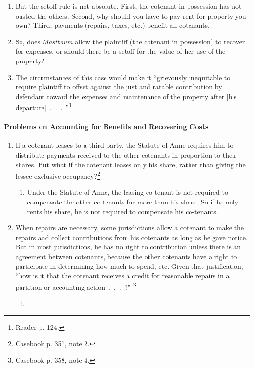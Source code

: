 \begin{enumerate}
\begin{enumerate}
        maintaining the property, ``many courts deemed it equitable that the 
        occupying tenant give credit for the value of his use and 
        occupation.''\footnote{Reader p. 123.}
        \item But the setoff rule is not absolute. First, the cotenant in 
        possession has not ousted the others. Second, why should you have to 
        pay rent for property you own? Third, payments (repairs, taxes, etc.) 
        benefit all cotenants.
        \item So, does \emph{Mastbaum} allow the plaintiff (the cotenant in 
        possession) to recover for expenses, or should there be a setoff for 
        the value of her use of the property?
        \item The circumstances of this case would make it ``grievously 
        inequitable to require plaintiff to offset against the just and 
        ratable contribution by defendant toward the expenses and maintenance 
        of the property after [his departure]~.~.~.~''\footnote{Reader p. 124.}
    \end{enumerate}
\end{enumerate}

\paragraph{Problems on Accounting for Benefits and Recovering Costs}

\begin{enumerate}
    \item If a cotenant leases to a third party, the Statute of Anne requires 
    him to distribute payments received to the other cotenants in proportion 
    to their shares. But what if the cotenant leases only his share, rather 
    than giving the lessee exclusive occupancy?\footnote{Casebook p. 357, note 
    2.}
    \begin{enumerate}
        \item Under the Statute of Anne, the leasing co-tenant is not required 
        to compensate the other co-tenants for more than his share. So if he 
        only rents his share, he is not required to compensate his co-tenants.
    \end{enumerate}
    \item When repairs are necessary, some jurisdictions allow a cotenant to 
    make the repairs and collect contributions from his cotenants as long as 
    he gave notice. But in most jurisdictions, he has no right to contribution 
    unless there is an agreement between cotenants, because the other 
    cotenants have a right to participate in determining how much to spend, 
    etc. Given that justification, ``how is it that the cotenant receives a 
    credit for reasonable repairs in a partition or accounting 
    action~.~.~.~?'' \footnote{Casebook p. 358, note 4.}
    \begin{enumerate}
        \item %
    \end{enumerate}
\end{enumerate}

